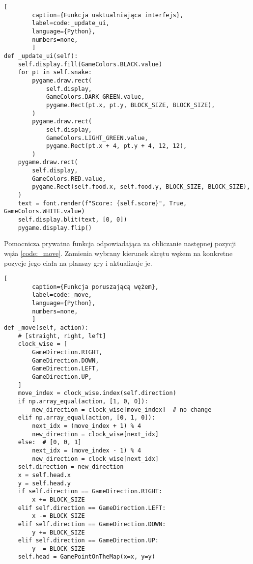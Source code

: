 \begin{onepage}
    \begin{lstlisting}[
        caption={Funkcja uaktualniająca interfejs},
        label=code:_update_ui,
        language={Python},
        numbers=none,
        ]
def _update_ui(self):
    self.display.fill(GameColors.BLACK.value)
    for pt in self.snake:
        pygame.draw.rect(
            self.display,
            GameColors.DARK_GREEN.value,
            pygame.Rect(pt.x, pt.y, BLOCK_SIZE, BLOCK_SIZE),
        )
        pygame.draw.rect(
            self.display,
            GameColors.LIGHT_GREEN.value,
            pygame.Rect(pt.x + 4, pt.y + 4, 12, 12),
        )
    pygame.draw.rect(
        self.display,
        GameColors.RED.value,
        pygame.Rect(self.food.x, self.food.y, BLOCK_SIZE, BLOCK_SIZE),
    )
    text = font.render(f"Score: {self.score}", True, GameColors.WHITE.value)
    self.display.blit(text, [0, 0])
    pygame.display.flip()
    \end{lstlisting}
\end{onepage}

\clearpage

Pomocnicza prywatna funkcja odpowiadająca za obliczanie następnej pozycji węża \ref{code:_move}. Zamienia wybrany kierunek skrętu wężem na konkretne pozycje jego ciała na planszy gry i aktualizuje je.

\begin{onepage}
    \begin{lstlisting}[
        caption={Funkcja poruszającą wężem},
        label=code:_move,
        language={Python},
        numbers=none,
        ]
def _move(self, action):
    # [straight, right, left]
    clock_wise = [
        GameDirection.RIGHT,
        GameDirection.DOWN,
        GameDirection.LEFT,
        GameDirection.UP,
    ]
    move_index = clock_wise.index(self.direction)
    if np.array_equal(action, [1, 0, 0]):
        new_direction = clock_wise[move_index]  # no change
    elif np.array_equal(action, [0, 1, 0]):
        next_idx = (move_index + 1) % 4
        new_direction = clock_wise[next_idx]
    else:  # [0, 0, 1]
        next_idx = (move_index - 1) % 4
        new_direction = clock_wise[next_idx]
    self.direction = new_direction
    x = self.head.x
    y = self.head.y
    if self.direction == GameDirection.RIGHT:
        x += BLOCK_SIZE
    elif self.direction == GameDirection.LEFT:
        x -= BLOCK_SIZE
    elif self.direction == GameDirection.DOWN:
        y += BLOCK_SIZE
    elif self.direction == GameDirection.UP:
        y -= BLOCK_SIZE
    self.head = GamePointOnTheMap(x=x, y=y)
    \end{lstlisting}
\end{onepage}



